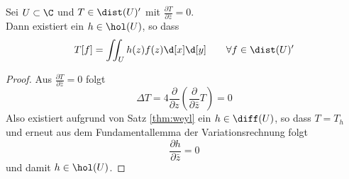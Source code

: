 \begin{cor}
  Sei $U \subset \C$ und $T \in \dist(U)'$ mit $\frac{\partial
    T}{\partial \bar z} = 0$. \\
  Dann existiert ein $h \in \hol(U)$, so dass
  \[
  T[f] = \iint_U h(z)f(z) \d[x]\d[y] \qquad \forall f \in \dist(U)'
  \]
\end{cor}

\begin{proof}
  Aus $\frac{\partial T}{\partial \bar z} = 0$ folgt
  \[
  \Delta T  = 4 \frac{\partial}{\partial z} \left (
    \frac{\partial}{\partial \bar z} T \right ) = 0
  \]
  Also existiert aufgrund von Satz \ref{thm:weyl} ein $h \in
  \diff(U)$, so dass $T = T_h$ und erneut aus dem Fundamentallemma der
  Variationsrechnung folgt
  \[
  \frac{\partial h}{\partial \bar z} = 0
  \]
  und damit $h \in \hol(U)$.
\end{proof}

